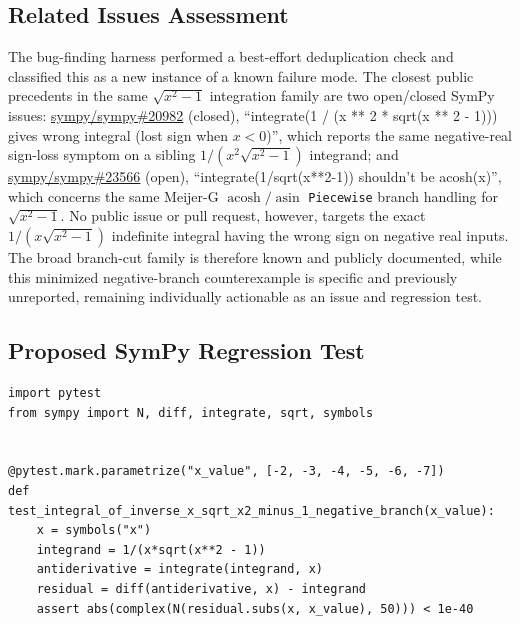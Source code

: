 \documentclass[11pt]{article}
\begin{document}
\subsection{Related Issues Assessment}

The bug-finding harness performed a best-effort deduplication check and classified
this as a new instance of a known failure mode.  The closest public precedents in
the same \(\sqrt{x^2-1}\) integration family are two open/closed SymPy issues:
\href{https://github.com/sympy/sympy/issues/20982}{sympy/sympy\#20982} (closed),
``integrate(1 / (x ** 2 * sqrt(x ** 2 - 1))) gives wrong integral (lost sign when
\(x<0\))'', which reports the same negative-real sign-loss symptom on a sibling
\(1/(x^2\sqrt{x^2-1})\) integrand; and
\href{https://github.com/sympy/sympy/issues/23566}{sympy/sympy\#23566} (open),
``integrate(1/sqrt(x**2-1)) shouldn't be acosh(x)'', which concerns the same
Meijer-G \(\operatorname{acosh}/\operatorname{asin}\) \texttt{Piecewise} branch
handling for \(\sqrt{x^2-1}\).  No public issue or pull request, however, targets
the exact \(1/(x\sqrt{x^2-1})\) indefinite integral having the wrong sign on
negative real inputs.  The broad branch-cut family is therefore known and
publicly documented, while this minimized negative-branch counterexample is
specific and previously unreported, remaining individually actionable as an issue
and regression test.

\subsection{Proposed SymPy Regression Test}

\medskip

\begin{lstlisting}[style=bugpython]
import pytest
from sympy import N, diff, integrate, sqrt, symbols


@pytest.mark.parametrize("x_value", [-2, -3, -4, -5, -6, -7])
def test_integral_of_inverse_x_sqrt_x2_minus_1_negative_branch(x_value):
    x = symbols("x")
    integrand = 1/(x*sqrt(x**2 - 1))
    antiderivative = integrate(integrand, x)
    residual = diff(antiderivative, x) - integrand
    assert abs(complex(N(residual.subs(x, x_value), 50))) < 1e-40
\end{lstlisting}
\end{document}
